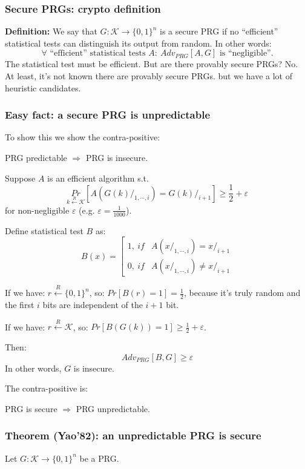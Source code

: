 \documentclass[12pt]{book}
\newcommand{\Def}{\textcolor{dkgreen}{\textbf{Definition:}} }
\begin{document}
\subsubsection{Secure PRGs: crypto definition}
\Def We say that $G:\mathcal{K}\rightarrow\{0,1\}^{n}$ is a secure PRG if no ``efficient'' statistical tests can distinguish its output from random. In other words:
$$\forall \text{ ``efficient'' statistical tests }A:\ Adv_{PRG}[A,G]\text{ is ``negligible''.}$$The statistical test must be efficient. But are there provably secure PRGs? No. At least, it's not known there are provably secure PRGs. but we have a lot of heuristic candidates.

\subsubsection{Easy fact: a secure PRG is unpredictable}
To show this we show the contra-positive:
\begin{center}
	PRG predictable $\Rightarrow$ PRG is insecure.
\end{center}

Suppose $A$ is an efficient algorithm s.t. 
$$\underset{k\xleftarrow{R}\mathcal{K}}{Pr}\left[A\left(G(k)/_{1,\cdots,i}\right)=G(k)/_{i+1}\right]\geq\frac{1}{2}+\varepsilon$$for non-negligible $\varepsilon$ (e.g. $\varepsilon=\frac{1}{1000}$).

Define statistical test $B$ as:
$$B(x)=\left[\begin{array}{cl}
	1,\ if&A\left(x/_{1,\cdots,i}\right) =x/_{i+1}\\[0.2cm]
	0,\ if&A\left(x/_{1,\cdots,i}\right) \neq x/_{i+1}
\end{array}\right.$$

If we have: $r\xleftarrow{R}\{0,1\}^{n}$, so: $Pr[B(r)=1]=\frac{1}{2}$, because it's truly random and the first $i$ bits are independent of the $i+1$ bit.

If we have: $r\xleftarrow{R}\mathcal{K}$, so: $Pr[B(G(k))=1]\geq\frac{1}{2}+\varepsilon$.

Then:
$$Adv_{PRG}[B,G]\geq\varepsilon$$In other words, $G$ is insecure.

The contra-positive is:
\begin{center}
	PRG is secure $\Rightarrow$ PRG unpredictable.
\end{center}

\subsubsection{Theorem (Yao'82): an unpredictable PRG is secure}
Let $G:\mathcal{K}\rightarrow\{0,1\}^{n}$ be a PRG.
\end{document}
